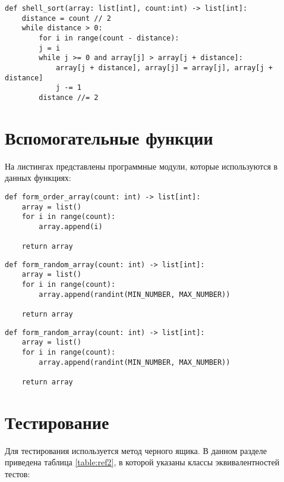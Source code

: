 \begin{lstlisting}[label=code3,caption=Программный код сортировки методом Шелла.]
def shell_sort(array: list[int], count:int) -> list[int]:
	distance = count // 2
	while distance > 0:
		for i in range(count - distance):
		j = i
		while j >= 0 and array[j] > array[j + distance]:
			array[j + distance], array[j] = array[j], array[j + distance]
			j -= 1
		distance //= 2
\end{lstlisting}

\section{Вспомогательные функции}
На листингах представлены программные модули, которые используются в данных функциях:
\begin{lstlisting}[label=code4,caption=Программный код формирования упорядоченного массива целых чисел.]
def form_order_array(count: int) -> list[int]:
	array = list()
	for i in range(count):
		array.append(i)

	return array
\end{lstlisting}

\begin{lstlisting}[label=code5,caption=Программный код формирования массива случайных целых чисел.]
def form_random_array(count: int) -> list[int]:
	array = list()
	for i in range(count):
		array.append(randint(MIN_NUMBER, MAX_NUMBER))
	
	return array
\end{lstlisting}

\begin{lstlisting}[label=code6,caption=Программный код формирования массива целых чисел\, упорядоченных в обратном порядке.]
def form_random_array(count: int) -> list[int]:
	array = list()
	for i in range(count):
		array.append(randint(MIN_NUMBER, MAX_NUMBER))
	
	return array
\end{lstlisting}

\section{Тестирование}
Для тестирования используется метод черного ящика. В данном разделе приведена таблица \ref{table:ref2}, в которой указаны классы эквивалентностей тестов: \\

